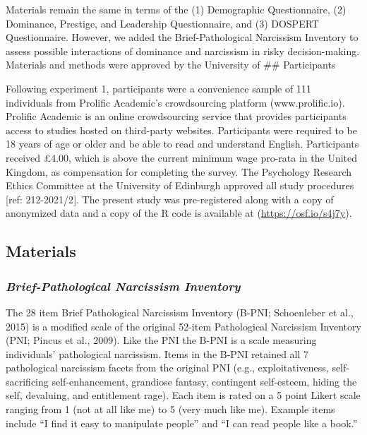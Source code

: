 \documentclass[
  donotrepeattitle,doc, 12pt, a4paper,floatsintext]{apa7}
\begin{document}
Materials remain the same in terms of the (1) Demographic Questionnaire, (2) Dominance, Prestige, and Leadership Questionnaire, and (3) DOSPERT Questionnaire. However, we added the Brief-Pathological Narcissism Inventory to assess possible interactions of dominance and narcissism in risky decision-making. Materials and methods were approved by the University of
\#\# Participants

Following experiment 1, participants were a convenience sample of 111 individuals from Prolific Academic's crowdsourcing platform (www.prolific.io). Prolific Academic is an online crowdsourcing service that provides participants access to studies hosted on third-party websites. Participants were required to be 18 years of age or older and be able to read and understand English. Participants received £4.00, which is above the current minimum wage pro-rata in the United Kingdom, as compensation for completing the survey. The Psychology Research Ethics Committee at the University of Edinburgh approved all study procedures {[}ref: 212-2021/2{]}. The present study was pre-registered along with a copy of anonymized data and a copy of the R code is available at (\url{https://osf.io/s4j7y}).

\hypertarget{materials}{%
\subsection{Materials}\label{materials}}

\hypertarget{brief-pathological-narcissism-inventory}{%
\subsubsection{\texorpdfstring{\emph{Brief-Pathological Narcissism Inventory}}{Brief-Pathological Narcissism Inventory}}\label{brief-pathological-narcissism-inventory}}

The 28 item Brief Pathological Narcissism Inventory (B-PNI; Schoenleber et al., 2015) is a modified scale of the original 52-item Pathological Narcissism Inventory (PNI; Pincus et al., 2009). Like the PNI the B-PNI is a scale measuring individuals' pathological narcissism. Items in the B-PNI retained all 7 pathological narcissism facets from the original PNI (e.g., exploitativeness, self-sacrificing self-enhancement, grandiose fantasy, contingent self-esteem, hiding the self, devaluing, and entitlement rage). Each item is rated on a 5 point Likert scale ranging from 1 (not at all like me) to 5 (very much like me). Example items include ``I find it easy to manipulate people'' and ``I can read people like a book.''
\end{document}
